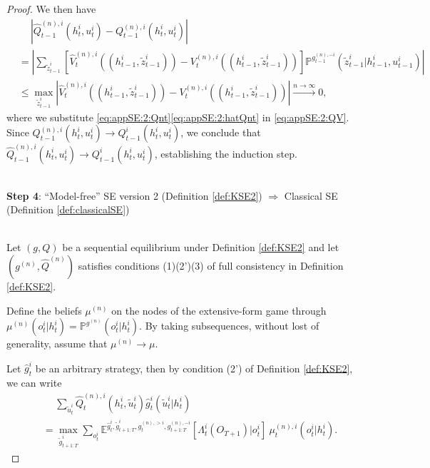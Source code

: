 \documentclass[pdflatex,sn-basic]{sn-jnl}
\newcommand{\E}{\mathbb{E}}
\renewcommand{\Pr}{\mathbb{P}}
\newcommand{\es}{\enspace\enspace\:}
\newcommand{\Qfunc}{Q}
\theoremstyle{thmstyleone}%
\theoremstyle{thmstyletwo}%
\theoremstyle{thmstylethree}%
\begin{document}
\begin{appendices}
\begin{proof}
		We then have
		\begin{align}
			&\es|\hat{\Qfunc}_{t-1}^{(n), i}(h_t^i, u_t^i) -\Qfunc_{t-1}^{(n), i}(h_t^i, u_t^i)| \\
			&= \left| \sum_{\tilde{z}_{t-1}^i} \left[\hat{V}_{t}^{(n), i}((h_{t-1}^i, \tilde{z}_{t-1}^i)) - V_{t}^{(n), i}((h_{t-1}^i, \tilde{z}_{t-1}^i))\right] \Pr^{g_{t-1}^{(n), -i}}(\tilde{z}_{t-1}^i|h_{t-1}^i, u_{t-1}^i) \right|\label{eq:appSE:2:QV} \\
			&\leq \max_{\tilde{z}_{t-1}^i}|\hat{V}_{t}^{(n), i}((h_{t-1}^i, \tilde{z}_{t-1}^i)) - V_{t}^{(n), i}((h_{t-1}^i, \tilde{z}_{t-1}^i))|\xrightarrow{n\rightarrow\infty} 0,
		\end{align}
        {where we substitute \eqref{eq:appSE:2:Qnt}\eqref{eq:appSE:2:hatQnt} in \eqref{eq:appSE:2:QV}.}
		Since $\Qfunc_{t-1}^{(n), i}(h_t^i, u_t^i) \rightarrow \Qfunc_{t-1}^{i}(h_t^i, u_t^i)$, we {conclude that} $\hat{\Qfunc}_{t-1}^{(n), i}(h_t^i, u_t^i) \rightarrow \Qfunc_{t-1}^{i}(h_t^i, u_t^i)$, establishing the induction step.\\~
		
		\textbf{Step 4}: ``Model-free'' SE version 2 (Definition \ref{def:KSE2}) $\Rightarrow$ Classical SE (Definition \ref{def:classicalSE})\\~
		
		Let $(g, \Qfunc)$ be a sequential equilibrium under Definition \ref{def:KSE2} and let $(g^{(n)}, \hat{\Qfunc}^{(n)})$ satisfies conditions (1)(2')(3) of full consistency in Definition \ref{def:KSE2}.
		
		Define the beliefs $\mu^{(n)}$ on the nodes of the extensive-form game through $\mu^{(n)}(o_t^i|h_t^i) = \Pr^{g^{(n)}}(o_t^i|h_t^i)$. By taking subsequences, without lost of generality, assume that $\mu^{(n)} \rightarrow \mu$.
		
		Let $\hat{g}_{t}^i$ be an arbitrary strategy, then {by condition (2') of Definition \ref{def:KSE2}, we can write}	\begin{equation}\label{eq:maxrew2goghattau}
			\begin{split}
				&\es\sum_{\tilde{u}_t^i} \hat{\Qfunc}_t^{(n), i}(h_t^i, \tilde{u}_t^i) \hat{g}_{t}^i(\tilde{u}_t^i|h_{t}^i) \\
				&= \max_{\tilde{g}_{t+1:T}^i} \sum_{o_t^i} \E^{\hat{g}_t^i, \tilde{g}_{t+1:T}^i, g_{t}^{(n), >i}, g_{t+1:T}^{(n), -i}}[\Lambda_t^i(O_{T+1})|o_t^i]\ \mu_t^{(n), i}(o_t^i|h_t^i).
			\end{split}
		\end{equation}
		

\end{proof}
\end{appendices}
\end{document}
